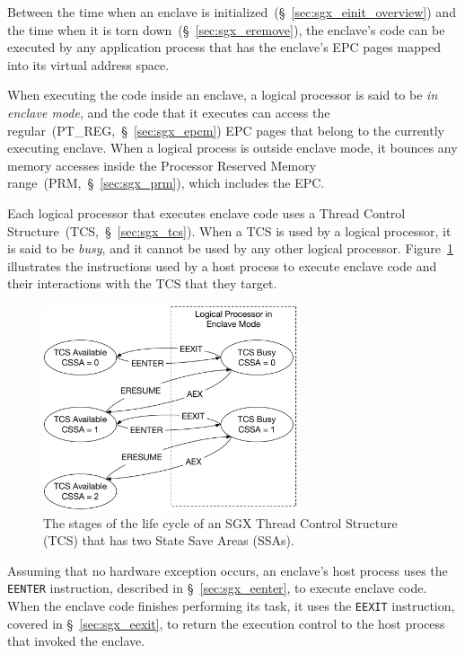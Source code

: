 \label{sec:sgx_threads}

Between the time when an enclave is
initialized~(\S~\ref{sec:sgx_einit_overview}) and the time when it is torn
down~(\S~\ref{sec:sgx_eremove}), the enclave's code can be executed by any
application process that has the enclave's EPC pages mapped into its virtual
address space.


When executing the code inside an enclave, a logical processor is said to be
\textit{in enclave mode}, and the code that it executes can access the
regular~(PT\_REG,~\S~\ref{sec:sgx_epcm}) EPC pages that belong to the currently
executing enclave. When a logical process is outside enclave mode, it bounces
any memory accesses inside the Processor Reserved Memory
range~(PRM,~\S~\ref{sec:sgx_prm}), which includes the EPC.

Each logical processor that executes enclave code uses a Thread Control
Structure~(TCS,~\S~\ref{sec:sgx_tcs}). When a TCS is used by a logical
processor, it is said to be \textit{busy}, and it cannot be used by any other
logical processor.  Figure~\ref{fig:sgx_tcs_lifecycle} illustrates the
instructions used by a host process to execute enclave code and their
interactions with the TCS that they target.

\begin{figure}[hbt]
  \centering
  \includegraphics[width=75mm]{figures/sgx_tcs_lifecycle.pdf}
  \caption{
    The stages of the life cycle of an SGX Thread Control Structure (TCS) that
    has two State Save Areas (SSAs).
  }
  \label{fig:sgx_tcs_lifecycle}
\end{figure}

Assuming that no hardware exception occurs, an enclave's host process uses the
\texttt{EENTER} instruction, described in \S~\ref{sec:sgx_eenter}, to execute
enclave code. When the enclave code finishes performing its task, it uses the
\texttt{EEXIT} instruction, covered in \S~\ref{sec:sgx_eexit}, to return the
execution control to the host process that invoked the enclave.

